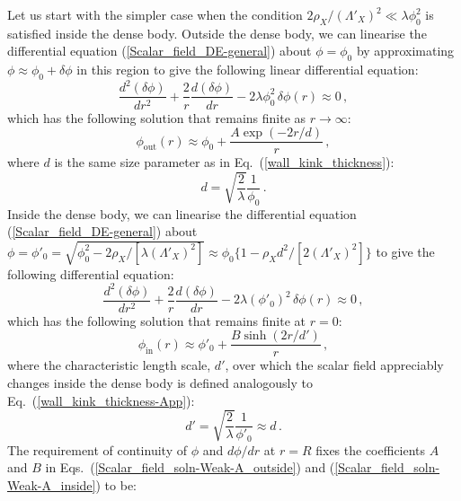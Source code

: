 \documentclass[aps,prd,onecolumn,nofootinbib]{revtex4-2} %
\begin{document}
Let us start with the simpler case when the condition $2 \rho_X / (\Lambda'_X)^2 \ll \lambda \phi_0^2$ is satisfied inside the dense body. 
Outside the dense body, we can linearise the differential equation (\ref{Scalar_field_DE-general}) about $\phi = \phi_0$ by approximating $\phi \approx \phi_0 + \delta \phi$ in this region to give the following linear differential equation: 
\begin{equation}
\label{Scalar_field_DE-Weak-A_outside}
\frac{d^2 (\delta \phi)}{d r^2} + \frac{2}{r} \frac{d (\delta \phi)}{d r} - 2 \lambda \phi_0^2 \, \delta \phi (r) \approx 0  \, , 
\end{equation}
which has the following solution that remains finite as $r \to \infty$: 
\begin{equation}
\label{Scalar_field_soln-Weak-A_outside}
\phi_\textrm{out} (r) \approx \phi_0 + \frac{A \exp \left( -2r / d \right)}{r}  \, , 
\end{equation}
where $d$ is the same size parameter as in Eq.~(\ref{wall_kink_thickness}): 
\begin{equation}
\label{wall_kink_thickness-App}
d = \sqrt{\frac{2}{\lambda}} \frac{1}{\phi_0}  \, . 
\end{equation}
Inside the dense body, we can linearise the differential equation (\ref{Scalar_field_DE-general}) about $\phi = \phi'_0 = \sqrt{\phi_0^2 - 2 \rho_X / [\lambda ( \Lambda'_X )^2]} \approx \phi_0 \{ 1 - \rho_X d^2 / [2 ( \Lambda'_X )^2] \}$ to give the following differential equation: 
\begin{equation}
\label{Scalar_field_DE-Weak-A_inside}
\frac{d^2 (\delta \phi)}{d r^2} + \frac{2}{r} \frac{d (\delta \phi)}{d r} - 2 \lambda (\phi'_0)^2 \, \delta \phi (r) \approx 0  \, , 
\end{equation}
which has the following solution that remains finite at $r = 0$: 
\begin{equation}
\label{Scalar_field_soln-Weak-A_inside}
\phi_\textrm{in} (r) \approx \phi'_0 + \frac{B \sinh \left( 2r / d' \right)}{r}  \, , 
\end{equation}
where the characteristic length scale, $d'$, over which the scalar field appreciably changes inside the dense body is defined analogously to Eq.~(\ref{wall_kink_thickness-App}): 
\begin{equation}
\label{char_length_scale-Weak-A_inside}
d' = \sqrt{\frac{2}{\lambda}} \frac{1}{\phi'_0} \approx d  \, . 
\end{equation}
The requirement of continuity of $\phi$ and $d \phi / dr$ at $r=R$ fixes the coefficients $A$ and $B$ in Eqs.~(\ref{Scalar_field_soln-Weak-A_outside}) and (\ref{Scalar_field_soln-Weak-A_inside}) to be: 
\end{document}
